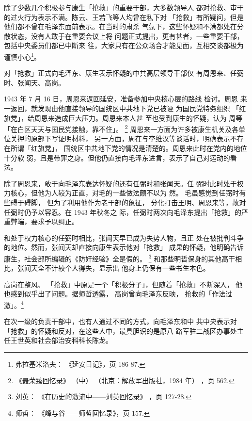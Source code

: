 除了少数几个积极参与康生「抢救」的重要干部，大多数领导人 都对抢救、审干
的过火行为表示不满。陈云、王若飞等人均曾在私下对 「抢救」有所疑问，但是
他们都不曾在毛泽东面前表示。在当时的肃杀 气氛下，这些怀疑和不满都处在分
散状态，没有人敢于在重要会议上将 问题正式提出，更有甚者，一些重要干部，
包括中央委员们都已中断来 往，大家只有在公众场合才能见面，互相交谈都极为
谨慎小心\footnote{弗拉基米洛夫： 《延安日记》，页 186-87.}。

对「抢救」正式向毛泽东、康生表示怀疑的中共高层领导干部仅
有周恩来、任弼时、张闻天、高岗。
 
1943 年 7 月 16 日，周恩来返回延安，准备参加中央核心层的路线 检讨。周恩
来一返回，就发现由他直接领导的国统区中共地下党已被诬 为国民党特务组织
「红旗党」，给周恩来造成巨大压力。周恩来本人甚 至也受到康生的怀疑，认为
周等「在白区天天与国民党接触，靠不住」。
\footnote{《聂荣臻回忆录》
（中）
（北京：解放军出版社，1984 年）
，页 562.}
周恩来一方面为许多被康生机关及各单位关押的原部下写证明材料，
另一方面，周在与李维汉等谈话时，明确表示不存在所谓「红旗党」，
国统区中共地下党的情况是清楚的。周恩来此时在党内的地位十分软
弱，且是带罪之身。但他仍直接向毛泽东进言，表示了自己对运动的看
法。

除了周恩来，敢于向毛泽东表达怀疑的还有任弼时和张闻天。任
弼时此时处于权力核心，但他为人较为正直，对毛的一些做法颇不以为
然。
毛虽感觉到任弼时有些碍于碍脚，
但为了利用他作为老干部的象征，
分化打击王明、周恩来等，故对任弼时仍予以容忍。在 1943 年秋冬之
际，任弼时两次向毛泽东提出「抢救」的严重弊端，要求予以纠正。

和处于权力核心的任弼时相比，张闻天早已成为失势人物，且正
处在被批判斗争的地位。然而，张闻天却直接向康生表示他对「抢救」
成果的怀疑，他明确告诉康生，社会部所编辑的《防奸经验》全是假的。
\footnote{刘英：
《在历史的激流中——刘英回忆录》
，页 127-28.}
和那些明哲保身的其他高干相比，张闻天全不计较个人得失，显示出
他身上仍保有一些书生本色。

高岗在整风、 「抢救」中原是一个「积极分子」，但随着「抢救」不断深入，
他也感到似乎出了问题。据师哲透露， 高岗曾向毛泽东反映， 抢救的「作法过
激」。\footnote{师哲： 《峰与谷——师哲回忆录》，页 157.} 

在次一级的负责干部中，也有人通过不同的方式，向毛泽东和中
共中央表示对「抢救」的怀疑和反对，在这些人中，最具胆识的是原八
路军驻二战区办事处主任王世英和社会部治安科科长陈龙。


